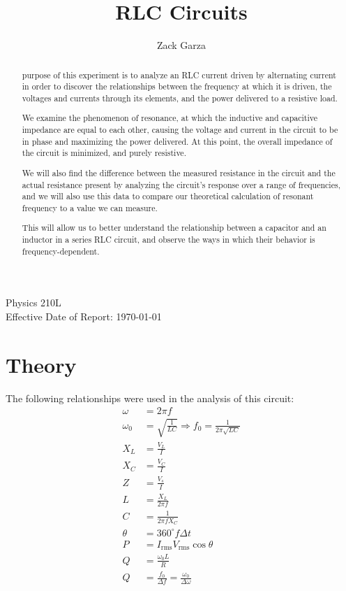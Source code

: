 \documentclass[twocolumn,english]{IEEEtran}
\newcommand{\thetitle}{RLC Circuits}
\newcommand{\theauthors}{Zack Garza}
\newcommand{\theclass}{Physics 210L}
\theoremstyle{plain}
\theoremstyle{plain}
\begin{document}
\title{\thetitle}
\author{\theauthors}
\IEEEspecialpapernotice
{\theclass \\ Effective Date of Report: \today }
\markboth{\thetitle}{\theauthors}
\maketitle

\begin{abstract}
 purpose of this experiment is to analyze an RLC current driven by alternating current in order to discover the relationships between the frequency at which it is driven, the voltages and currents through its elements, and the power delivered to a resistive load.

We examine the phenomenon of resonance, at which the inductive and capacitive impedance are equal to each other, causing the voltage and current in the circuit to be in phase and maximizing the power delivered. At this point, the overall impedance of the circuit is minimized, and purely resistive.

We will also find the difference between the measured resistance in the circuit and the actual resistance present by analyzing the circuit's response over a range of frequencies, and we will also use this data to compare our theoretical calculation of resonant frequency to a value we can measure.

This will allow us to better understand the relationship between a capacitor and an inductor in a series RLC circuit, and observe the ways in which their behavior is frequency-dependent.
\end{abstract}

\tableofcontents

\section{Theory}

The following relationships were used in the analysis of this circuit:
\begin{align*}
	\omega &= 2\pi f \\
	\omega_0 &= \sqrt{\frac{1}{LC}} \Rightarrow f_0 = \frac{1}{2\pi\sqrt{LC}}\\
	X_L &= \frac{V_L}{I} \\
	X_C &= \frac{V_C}{I} \\
	Z &= \frac{V_s}{I} \\
	L &= \frac{X_L}{2\pi f} \\
	C &= \frac{1}{2\pi f X_C} \\
	\theta &= 360^{\circ} f\Delta t \\
	P &= I_{\text{rms}} V_{\text{rms}} \cos\theta \\
	Q &= \frac{\omega_0 L}{R} \\
	Q &= \frac{f_0}{\Delta f} = \frac{\omega_0}{\Delta \omega}
\end{align*}
\end{document}
